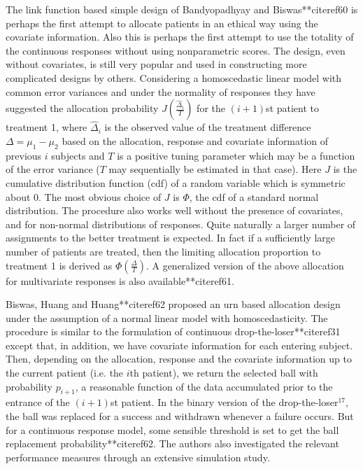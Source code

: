 The link function based simple design of Bandyopadhyay and Biswas**citeref{60} is perhaps the first
attempt to allocate patients in an ethical way using the covariate
information. Also this is perhaps the first attempt to use the totality of the continuous responses without using nonparametric scores. The design, even without covariates, is still very popular and used in constructing more complicated designs by others. Considering a homoscedastic linear model with common error variances and under the normality of responses they have suggested the allocation probability $J(\frac{\hat{\Delta}_{i}}{T})$ for the $(i+1)$st patient to treatment 1, where ${\hat\Delta}_{i}$ is the observed value of the treatment difference $\Delta=\mu_1-\mu_2$ based on the allocation, response and covariate information of previous $i$ subjects and $T$ is a positive tuning parameter which may be a function of the error variance ($T$ may sequentially be estimated in that case). Here $J$ is the cumulative distribution function (cdf) of a random variable which is symmetric about 0. The most obvious choice of $J$ is $\Phi$, the cdf of a standard normal distribution. The procedure also works well without the presence of covariates, and for non-normal distributions of responses. Quite naturally a larger number of assignments to the better treatment is expected. In fact if a sufficiently large number of patients are treated, then the limiting allocation proportion to treatment 1 is derived as
$\Phi(\frac{\Delta}{T})$. A generalized version of the above allocation for multivariate responses is also available**citeref{61}.

Biswas, Huang and Huang**citeref{62} proposed an urn based
allocation design under the assumption of a normal linear model
with homoscedasticity. The procedure is similar to the formulation of
continuous drop-the-loser**citeref{31} except that, in addition, we have covariate information for each entering subject.
Then, depending on the allocation, response and the covariate
information up to the current patient (i.e. the $i$th patient), we return the selected ball with probability $p_{i+1}$, a reasonable function
of the data accumulated prior to the entrance of the $(i+1)$st patient. In the binary version of the drop-the-loser$^{17}$, the ball was replaced for a success and withdrawn whenever a failure occurs.
But for a continuous response model, some sensible threshold is set  to get the ball replacement probability**citeref{62}. The authors also investigated the relevant performance measures through an extensive simulation study.

